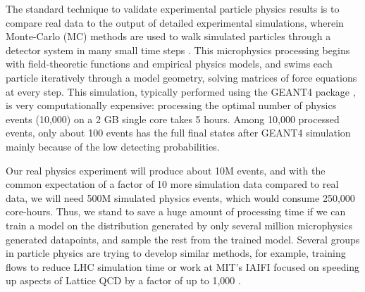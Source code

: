 The standard technique to validate experimental particle physics results is to compare real data to the output of detailed experimental simulations, wherein Monte-Carlo (MC) methods are used to walk simulated particles through a detector system in many small time steps \cite{PhysRevLett.115.212003, 10.1093/ptep/ptaa104}. This microphysics processing begins with field-theoretic functions and empirical physics models, and swims each particle iteratively through a model geometry, solving matrices of force equations at every step. This simulation, typically performed using the GEANT4 package \cite{AGOSTINELLI2003250}, is very computationally expensive: processing the optimal number of physics events (10,000) on a 2 GB single core takes 5 hours. Among 10,000 processed events, only about 100 events has the full final states after GEANT4 simulation mainly because of the low detecting probabilities.

Our real physics experiment will produce about 10M events, and with the common expectation of a factor of 10 more simulation data compared to real data, we will need 500M simulated physics events, which would consume 250,000 core-hours. Thus, we stand to save a huge amount of processing time if we can train a model on the distribution generated by only several million microphysics generated datapoints, and sample the rest from the trained model. Several groups in particle physics are trying to develop similar methods, for example, training flows to reduce LHC simulation time \cite{stan} or work at MIT's IAIFI focused on speeding up aspects of Lattice QCD by a factor of up to 1,000 \cite{phialia}.


